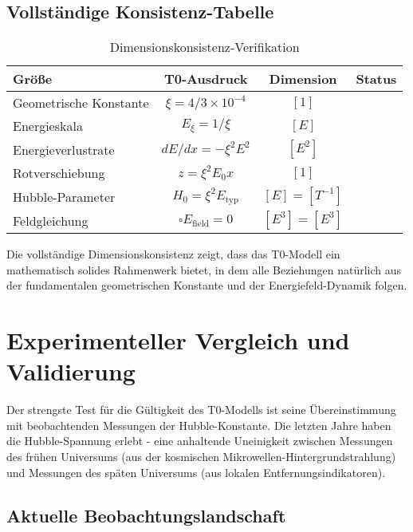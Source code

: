 \documentclass[12pt,a4paper]{article}
\begin{document}
	\subsection{Vollständige Konsistenz-Tabelle}
	
	\begin{table}[htbp]
		\centering
		\begin{tabular}{lccc}
			\toprule
			\textbf{Größe} & \textbf{T0-Ausdruck} & \textbf{Dimension} & \textbf{Status} \\
			\midrule
			Geometrische Konstante & $\xi = 4/3 \times 10^{-4}$ & $[1]$ & \checkmark \\
			Energieskala & $E_\xi = 1/\xi$ & $[E]$ & \checkmark \\
			Energieverlustrate & $dE/dx = -\xi^2 E^2$ & $[E^2]$ & \checkmark \\
			Rotverschiebung & $z = \xi^2 E_0 x$ & $[1]$ & \checkmark \\
			Hubble-Parameter & $H_0 = \xi^2 E_{\text{typ}}$ & $[E] = [T^{-1}]$ & \checkmark \\
			Feldgleichung & $\square E_{\text{field}} = 0$ & $[E^3] = [E^3]$ & \checkmark \\
			\bottomrule
		\end{tabular}
		\caption{Dimensionskonsistenz-Verifikation}
		\label{tab:dimensional_check}
	\end{table}
	
	Die vollständige Dimensionskonsistenz zeigt, dass das T0-Modell ein mathematisch solides Rahmenwerk bietet, in dem alle Beziehungen natürlich aus der fundamentalen geometrischen Konstante und der Energiefeld-Dynamik folgen.
	
	\section{Experimenteller Vergleich und Validierung}
	
	Der strengste Test für die Gültigkeit des T0-Modells ist seine Übereinstimmung mit beobachtenden Messungen der Hubble-Konstante. Die letzten Jahre haben die Hubble-Spannung erlebt - eine anhaltende Uneinigkeit zwischen Messungen des frühen Universums (aus der kosmischen Mikrowellen-Hintergrundstrahlung) und Messungen des späten Universums (aus lokalen Entfernungsindikatoren).
	
	\subsection{Aktuelle Beobachtungslandschaft}
	
\end{document}

